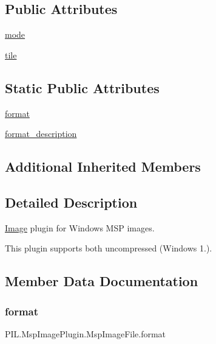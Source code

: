 \subsection*{Public Attributes}
\begin{DoxyCompactItemize}
\item 
\hyperlink{classPIL_1_1MspImagePlugin_1_1MspImageFile_aa0efcab24b9912a22bc12056fe9eb1a8}{mode}
\item 
\hyperlink{classPIL_1_1MspImagePlugin_1_1MspImageFile_a60f13dc0595d1b2dc90c29b8ce13bd56}{tile}
\end{DoxyCompactItemize}
\subsection*{Static Public Attributes}
\begin{DoxyCompactItemize}
\item 
\hyperlink{classPIL_1_1MspImagePlugin_1_1MspImageFile_a03b95121fca404e5991427b30e9a1879}{format}
\item 
\hyperlink{classPIL_1_1MspImagePlugin_1_1MspImageFile_aee9b3850c382c781f9d71dad74c5358b}{format\+\_\+description}
\end{DoxyCompactItemize}
\subsection*{Additional Inherited Members}


\subsection{Detailed Description}
\hyperlink{namespacePIL_1_1Image}{Image} plugin for Windows M\+SP images. 

This plugin supports both uncompressed (Windows 1.). 

\subsection{Member Data Documentation}
\mbox{\label{classPIL_1_1MspImagePlugin_1_1MspImageFile_a03b95121fca404e5991427b30e9a1879}} 
\subsubsection{\texorpdfstring{format}{format}}
{\footnotesize\ttfamily P\+I\+L.\+Msp\+Image\+Plugin.\+Msp\+Image\+File.\+format\hspace{0.3cm}{\ttfamily [static]}}


